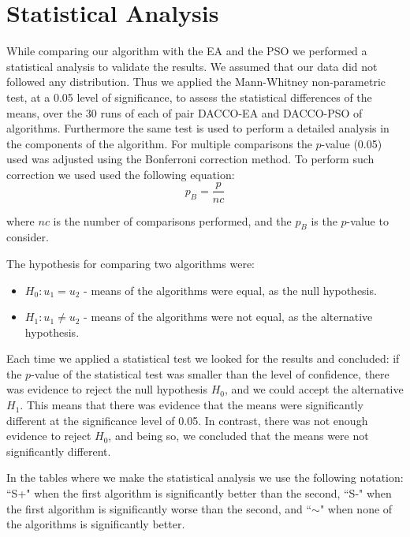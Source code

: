 \section*{Statistical Analysis}
\label{sec:statistical_analysis}
While comparing our algorithm with the EA and the PSO we performed a statistical analysis to validate the results. We assumed that our data did not followed any distribution. Thus we applied the Mann-Whitney non-parametric test, at a 0.05 level of significance, to assess the statistical differences of the means, over the 30 runs of each of pair DACCO-EA and DACCO-PSO of algorithms. Furthermore the same test is used to perform a detailed analysis in the components of the algorithm. For multiple comparisons the $p$-value (0.05) used was adjusted using the Bonferroni correction method. To perform such correction we used used the following equation:
\begin{equation}
	p_B = \frac{p} {nc}
\end{equation}

where $nc$ is the number of comparisons performed, and the $p_B$ is the $p$-value to consider.

The hypothesis for comparing two algorithms were:
\begin{itemize}
	\item $H_{0} : u_1 = u_2$ - means of the algorithms were equal, as the null hypothesis.
	\item $H_{1} : u_1 \neq u_2$ - means of the algorithms were not equal, as the alternative hypothesis.
\end{itemize}

Each time we applied a statistical test we looked for the results and concluded: if the $p$-value of the statistical test was smaller than the level of confidence, there was evidence to reject the null hypothesis $H_{0}$, and we could accept the alternative $H_{1}$. This means that there was evidence that the means were significantly different  at the significance level of 0.05. In contrast, there was not enough evidence to reject $H_{0}$, and being so, we concluded that the means were not significantly different.

In the tables where we make the statistical analysis we use the following notation: ``S+" when the first algorithm is significantly better than the second, ``S-" when the first algorithm is significantly worse than the second, and ``$\sim$" when none of the algorithms is significantly better.



